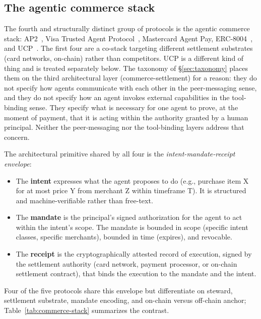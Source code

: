\subsection{The agentic commerce stack}
\label{sec:emerging:commerce}

The fourth and structurally distinct group of protocols is
the agentic commerce stack: AP2~\cite{spec_ap2}, Visa
Trusted Agent Protocol~\cite{spec_visa_tap}, Mastercard
Agent Pay, ERC-8004~\cite{spec_erc8004}, and
UCP~\cite{spec_ucp}. The first four are a co-stack
targeting different settlement substrates (card networks,
on-chain) rather than competitors. UCP is a different kind
of thing and is treated separately below. The taxonomy of \S\ref{sec:taxonomy} places
them on the third architectural layer
(commerce-settlement) for a reason: they do not specify
how agents communicate with each other in the
peer-messaging sense, and they do not specify how an
agent invokes external capabilities in the tool-binding
sense. They specify what is necessary for one agent to
prove, at the moment of payment, that it is acting within
the authority granted by a human principal. Neither the
peer-messaging nor the tool-binding layers
address that concern.

The architectural primitive shared by all four is the
\emph{intent-mandate-receipt envelope}:

\begin{itemize}
  \item The \textbf{intent} expresses what the agent
    proposes to do (e.g., purchase item X for at most
    price Y from merchant Z within timeframe T). It is
    structured and machine-verifiable rather than
    free-text.
  \item The \textbf{mandate} is the principal's signed
    authorization for the agent to act within the
    intent's scope. The mandate is bounded in scope
    (specific intent classes, specific merchants),
    bounded in time (expires), and revocable.
  \item The \textbf{receipt} is the cryptographically
    attested record of execution, signed by the
    settlement authority (card network, payment
    processor, or on-chain settlement contract), that
    binds the execution to the mandate and the intent.
\end{itemize}

Four of the five protocols share this envelope but
differentiate on steward, settlement substrate, mandate
encoding, and on-chain versus off-chain anchor;
Table~\ref{tab:commerce-stack} summarizes the contrast.


